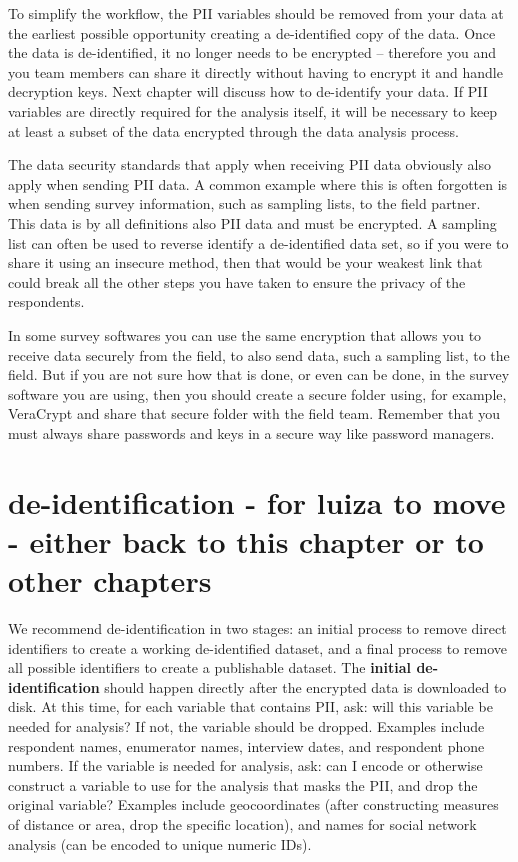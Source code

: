 To simplify the workflow, the PII variables should be removed from your data at the earliest 
possible opportunity creating a de-identified copy of the data. Once the data is de-identified,
it no longer needs to be encrypted -- therefore you and you team members can share it directly 
without having to encrypt it and handle decryption keys. Next chapter will discuss how to 
de-identify your data. If PII variables are directly required for the analysis itself, it will 
be necessary to keep at least a subset of the data encrypted through the data analysis process.

The data security standards that apply when receiving PII data obviously also apply when sending 
PII data. A common example where this is often forgotten is when sending survey information, 
such as sampling lists, to the field partner. This data is by all definitions also PII data and 
must be encrypted. A sampling list can often be used to reverse identify a de-identified data set,
so if you were to share it using an insecure method, then that would be your weakest link that 
could break all the other steps you have taken to ensure the privacy of the respondents.

In some survey softwares you can use the same encryption that allows you to receive data securely 
from the field, to also send data, such a sampling list, to the field. But if you are not sure how 
that is done, or even can be done, in the survey software you are using, then you should create a 
secure folder using, for example, VeraCrypt and share that secure folder with the field team. 
Remember that you must always share passwords and keys in a secure way like password managers.



\section{de-identification - for luiza to move - either back to this chapter or to other chapters}

We recommend de-identification in two stages:
an initial process to remove direct identifiers to create a working de-identified dataset,
and a final process to remove all possible identifiers to create a publishable dataset.
The \textbf{initial de-identification} should happen directly after the encrypted data is downloaded to disk.
At this time, for each variable that contains PII, ask: will this variable be needed for analysis?
If not, the variable should be dropped.
Examples include respondent names, enumerator names, interview dates, and respondent phone numbers.
If the variable is needed for analysis, ask:
can I encode or otherwise construct a variable to use for the analysis that masks the PII,
and drop the original variable?
Examples include geocoordinates (after constructing measures of distance or area, drop the specific location), and names for social network analysis (can be encoded to unique numeric IDs).


